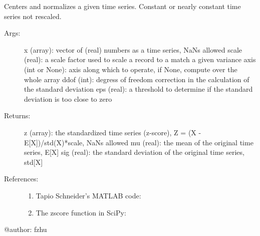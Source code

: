 \documentclass[letterpaper,10pt,english]{sphinxmanual}
\begin{document}
\begin{fulllineitems}
\label{\detokenize{Timeseries:pyleoclim.Timeseries.standardize}}
Centers and normalizes a given time series. Constant or nearly constant time series not rescaled.
\begin{description}
\item[{Args:}] \leavevmode
x (array): vector of (real) numbers as a time series, NaNs allowed
scale (real): a scale factor used to scale a record to a match a given variance
axis (int or None): axis along which to operate, if None, compute over the whole array
ddof (int): degress of freedom correction in the calculation of the standard deviation
eps (real): a threshold to determine if the standard deviation is too close to zero

\item[{Returns:}] \leavevmode
z (array): the standardized time series (z-score), Z = (X - E{[}X{]})/std(X)*scale, NaNs allowed
mu (real): the mean of the original time series, E{[}X{]}
sig (real): the standard deviation of the original time series, std{[}X{]}

\item[{References:}] \leavevmode\begin{enumerate}
\item {} 
Tapio Schneider’s MATLAB code: 

\item {} 
The zscore function in SciPy: 

\end{enumerate}

\end{description}

@author: fzhu

\end{fulllineitems}

\end{document}
